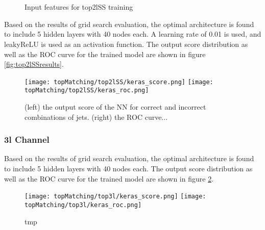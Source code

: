 \begin{figure}
    \\
    \\
    \caption{Input features for top2lSS training}
    \label{fig:features_top2lSS}
\end{figure}

Based on the results of grid search evaluation, the optimal architecture is found to include 5 hidden layers with 40 nodes each. A learning rate of 0.01 is used, and leakyReLU is used as an activation function. The output score distribution as well as the ROC curve for the trained model are shown in figure \ref{fig:top2lSSresults}.

\begin{figure}
  \texttt{[image: topMatching/top2lSS/keras\_score.png]}%
  \texttt{[image: topMatching/top2lSS/keras\_roc.png]}
  \caption{(left) the output score of the NN for correct and incorrect combinations of jets. (right) the ROC curve...}
\end{figure}

\subsubsection{3l Channel}
\label{subsec:top3l}

Based on the results of grid search evaluation, the optimal architecture is found to include 5 hidden layers with 40 nodes each. The output score distribution as well as the ROC curve for the trained model are shown in figure \ref{fig:top3lresults}.

\begin{figure}
  \texttt{[image: topMatching/top3l/keras\_score.png]}%
  \texttt{[image: topMatching/top3l/keras\_roc.png]}
  \label{fig:top3lresults}
  \caption{tmp}
\end{figure}

